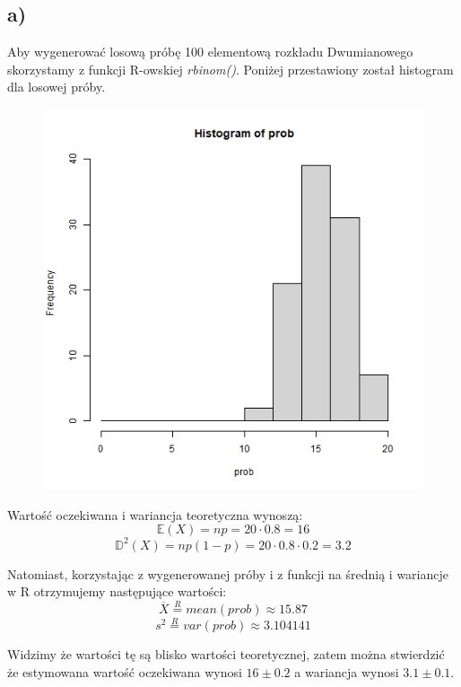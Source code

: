 \documentclass{article}
\begin{document}
\subsection{a)}
Aby wygenerować losową próbę 100 elementową rozkładu Dwumianowego skorzystamy z funkcji R-owskiej \textit{rbinom()}. Poniżej przestawiony został histogram dla losowej próby.
\begin{figure}[h!]
\begin{center}
\includegraphics[height = 0.4\textheight, angle = 0]{"lab7zad6_a.png"}
\end{center}
\end{figure}

Wartość oczekiwana i wariancja teoretyczna wynoszą:
\[ \mathbb{E}(X) = np = 20\cdot0.8 = 16 \]
\[ \mathbb{D}^2(X) = np(1-p) = 20\cdot 0.8\cdot 0.2 = 3.2 \]

Natomiast, korzystając z wygenerowanej próby i z funkcji na średnią i wariancje w R otrzymujemy następujące wartości:
\[ \overline{X} \overset{R}{=} mean(prob) \approx 15.87 \]
\[ s^2 \overset{R}{=} var(prob) \approx 3.104141 \]

Widzimy że wartości tę są blisko wartości teoretycznej, zatem można stwierdzić że estymowana wartość oczekiwana wynosi $16 \pm 0.2$ a wariancja wynosi $3.1 \pm 0.1$.
\end{document}
